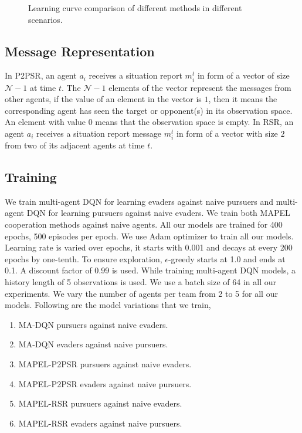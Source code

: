 \documentclass[conference]{IEEEtran}
\begin{document}
\begin{figure}[t]
        \vspace{1mm}
     \caption{Learning curve comparison of different methods in different scenarios.}
     \label{fig:converge}
\end{figure}

\subsection{Message Representation}

In P2PSR, an agent $a_i$ receives a situation report $m^{t}_i$ in form of a vector of size $\mathcal{N}-1$ at time $t$. The $\mathcal{N}-1$ elements of the vector represent the messages from other agents, if the value of an element in the vector is $1$, then it means the corresponding agent has seen the target or opponent(s) in its observation space. An element with value $0$ means that the observation space is empty. In RSR, an agent $a_i$ receives a situation report message $m^{t}_i$ in form of a vector with size $2$ from two of its adjacent agents at time $t$.

\subsection{Training}

We train multi-agent DQN for learning evaders against naive pursuers and multi-agent DQN for learning pursuers against naive evaders. We train both MAPEL cooperation methods against naive agents. All our models are trained for 400 epochs, 500 episodes per epoch. We use Adam \cite{KingmaB2014ICLR} optimizer to train all our models. Learning rate is varied over epochs, it starts with 0.001 and decays at every 200 epochs by one-tenth. To ensure exploration, $\epsilon$-greedy starts at 1.0 and ends at 0.1. A discount factor of 0.99 is used. While training multi-agent DQN models, a history length of 5 observations is used. We use a batch size of 64 in all our experiments. We vary the number of agents per team from 2 to 5 for all our models. Following are the model variations that we train,

\begin{enumerate}
\item MA-DQN pursuers against naive evaders.
\item MA-DQN evaders against naive pursuers.
\item MAPEL-P2PSR pursuers against naive evaders.
\item MAPEL-P2PSR evaders against naive pursuers.
\item MAPEL-RSR pursuers against naive evaders.
\item MAPEL-RSR evaders against naive pursuers.
\end{enumerate}
\end{document}
